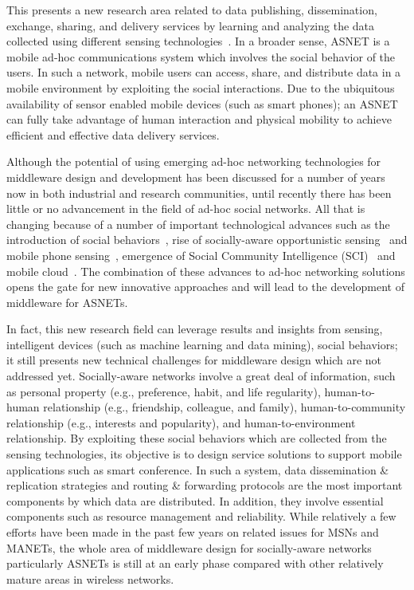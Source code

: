 This presents a new research area related to data publishing, dissemination, exchange, sharing, and delivery services by learning and analyzing the data collected using different sensing technologies~\cite{RKGanti2011}. In a broader sense, ASNET is a mobile ad-hoc communications system which involves the social behavior of the users. In such a network, mobile users can access, share, and distribute data in a mobile environment by exploiting the social interactions. Due to the ubiquitous availability of sensor enabled mobile devices (such as smart phones); an ASNET can fully take advantage of human interaction and physical mobility to achieve efficient and effective data delivery services.

Although the potential of using emerging ad-hoc networking technologies for middleware design and development has been discussed for a number of years now in both industrial and research communities, until recently there has been little or no advancement in the field of ad-hoc social networks. All that is changing because of a number of important technological advances such as the introduction of social behaviors~\cite{FXia2013}, rise of socially-aware opportunistic sensing~\cite{HJohnson2011} and mobile phone sensing~\cite{NDLane2010}, emergence of Social Community Intelligence (SCI)~\cite{DZhang2012} and mobile cloud~\cite{NFernando2013}. The combination of these advances to ad-hoc networking solutions opens the gate for new innovative approaches and will lead to the development of middleware for ASNETs.

In fact, this new research field can leverage results and insights from sensing, intelligent devices (such as machine learning and data mining), social behaviors; it still presents new technical challenges for middleware design which are not addressed yet. Socially-aware networks involve a great deal of information, such as personal property (e.g., preference, habit, and life regularity), human-to-human relationship (e.g., friendship, colleague, and family), human-to-community relationship (e.g., interests and popularity), and human-to-environment relationship. By exploiting these social behaviors which are collected from the sensing technologies, its objective is to design service solutions to support mobile applications such as smart conference. In such a system, data dissemination \& replication strategies and routing \& forwarding protocols are the most important components by which data are distributed. In addition, they involve essential components such as resource management and reliability. While relatively a few efforts have been made in the past few years on related issues for MSNs and MANETs, the whole area of middleware design for socially-aware networks particularly ASNETs is still at an early phase compared with other relatively mature areas in wireless networks.

